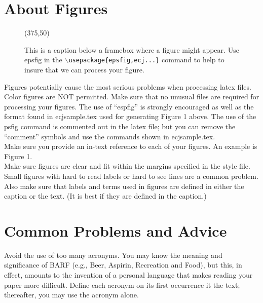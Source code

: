 \documentclass[twoside]{article}
\begin{document}
\section{About Figures}

\begin{figure}[t]
\begin{center}
\centerline{ 
\framebox(375,50)
}
\end{center}
\caption{This is a caption below a framebox where a
figure might appear.  Use epsfig in the {\tt $\backslash$usepackage\{epsfig,ecj...\}} 
command to help to insure that we can process your figure.}
\label{graph1}
\end{figure}

Figures potentially cause the most serious problems when
processing latex files.  Color figures are NOT permitted. Make sure that 
no unusual files are required for processing your figures.
The use of ``espfig'' is strongly encouraged as well as the
format found in ecjsample.tex used for generating Figure 1 above.
The use of the psfig command is commented out in the latex file;
but you can remove the ``comment'' symbols and use the
commands shown in ecjsample.tex.\\

Make sure you provide an in-text reference to each of your figures.  An 
example is Figure 1.\\

Make sure figures are clear and fit within the margins specified in the 
style file.  Small figures with hard to read labels or hard to see lines are 
a common problem.  Also make sure that labels and terms used in figures are
defined in either the caption or the text. (It is best if they
are defined in the caption.)

\section{Common Problems and Advice}

Avoid the use of too many acronyms. You may know the meaning and 
significance of BARF (e.g., Beer, Aspirin, Recreation and Food), but this, 
in effect, amounts to the invention of a personal language that makes 
reading your paper more difficult.  Define each acronym on its first 
occurrence it the text; thereafter, you may use the acronym alone.\\
\end{document}
